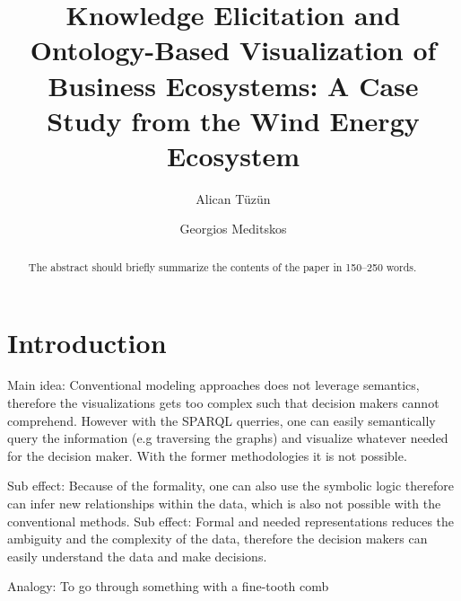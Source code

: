 \documentclass[runningheads]{llncs}
\begin{document}
%
\title{Knowledge Elicitation and Ontology-Based Visualization of Business Ecosystems: A Case Study from the 
Wind Energy Ecosystem}
%
%
\author{Alican Tüzün \and
Georgios Meditskos
}
%
%
%
\maketitle              %
%
\begin{abstract}
The abstract should briefly summarize the contents of the paper in
150--250 words.

\end{abstract}
%
%
%
\section{Introduction}

Main idea: Conventional modeling approaches does not leverage semantics, therefore the visualizations gets too complex such that decision makers cannot comprehend.
However with the SPARQL querries, one can easily semantically query the information (e.g traversing the graphs) and visualize whatever needed for the decision maker. With the former 
methodologies it is not possible.

Sub effect: Because of the formality, one can also use the symbolic logic therefore can infer new relationships within the data, which is also not possible with the conventional methods.
Sub effect: Formal and needed representations reduces the ambiguity and the complexity of the data, therefore the decision makers can easily understand the data and make decisions.

Analogy: To go through something with a fine-tooth comb 
\end{document}
